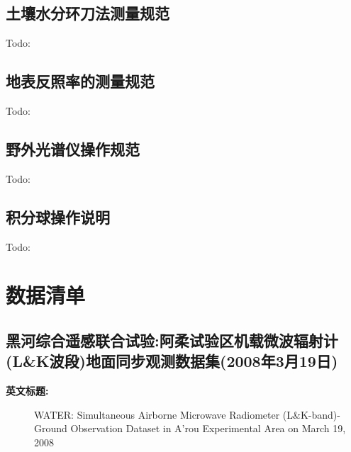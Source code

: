 \documentclass[letterpaper,10pt,english]{sphinxmanual}
\begin{document}
\section{土壤水分环刀法测量规范}
\label{observe_standard:id21}
Todo:


\section{地表反照率的测量规范}
\label{observe_standard:id22}
Todo:


\section{野外光谱仪操作规范}
\label{observe_standard:id23}
Todo:


\section{积分球操作说明}
\label{observe_standard:id24}
Todo:


\chapter{数据清单}
\label{doc_datalist:doc-datalist}\label{doc_datalist::doc}\label{doc_datalist:id1}

\section{黑河综合遥感联合试验:阿柔试验区机载微波辐射计(L\&K波段)地面同步观测数据集(2008年3月19日)}
\label{fecd46b0-3390-4580-a415-2d49ba77f9bd:fecd46b0-3390-4580-a415-2d49ba77f9bd}\label{fecd46b0-3390-4580-a415-2d49ba77f9bd:l-k-2008319}\label{fecd46b0-3390-4580-a415-2d49ba77f9bd::doc}\begin{description}
\item[{\textbf{英文标题:}}] \leavevmode
WATER: Simultaneous Airborne Microwave Radiometer (L\&K-band)-Ground Observation Dataset in A'rou Experimental Area on March 19, 2008

\end{description}
\end{document}
